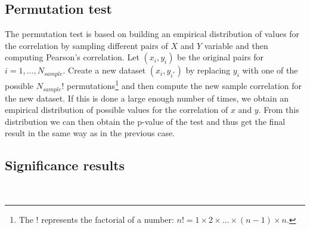 \subsection{Permutation test}
 The permutation test is based on building an empirical distribution of values for the correlation by sampling different pairs of $X$ and $Y$ variable and then computing Pearson's correlation. 
 Let $(x_i, y_i)$ be the original pairs for $i=1, \dots, N_{sample}$. Create a new dataset $(x_i, y_{i^*})$ by replacing $y_i$ with one of the possible $N_{sample}!$ permutations\footnote{The $!$ represents the factorial of a number: $n! = 1\times 2 \times ... \times (n-1)\times n$.} and then compute the new sample correlation for the new dataset.
 If this is done a large enough number of times, we obtain an empirical distribution of possible values for the correlation of $x$ and $y$. 
 From this distribution we can then obtain the p-value of the test and thus get the final result in the same way as in the previous case.
 

\subsection{Significance results}

\begin{table}
	\small
	\caption[Correlation values with significance]{Values of the correlation between Bitcoin and the other assets and their p-value using both Pearson's and the permutation test. }
	\label{tab:corr_significance}
\noindent{}
\\
\bigskip

\noindent{}

\end{table}

